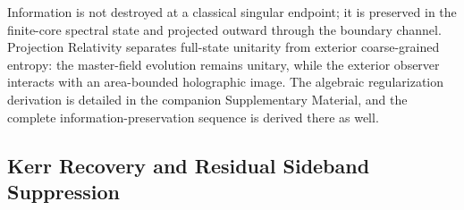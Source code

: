 \documentclass[11pt]{article}
\begin{document}
Information is not destroyed \cite{hawking_penrose_1970} at a classical singular 
endpoint; it is preserved in the finite-core spectral state and projected outward 
through the boundary channel. Projection Relativity separates full-state unitarity from exterior coarse-grained entropy: the master-field evolution remains unitary, while the exterior observer interacts with an area-bounded holographic image. The algebraic regularization derivation is detailed in the companion Supplementary Material, and the complete information-preservation 
sequence is derived there as well.

\subsection{Kerr Recovery and Residual Sideband Suppression}
\label{sec:kerr_recovery_and_suppression}
\end{document}
